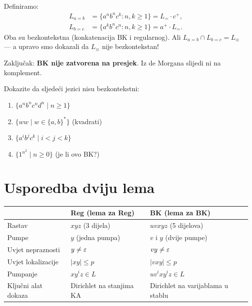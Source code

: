 \begin{primjer}
Definiramo:
\begin{align*}
  L_{a=b} &= \{a^n b^n c^k : n, k \geq 1\} = L_= \cdot c^+, \\
  L_{b=c} &= \{a^k b^n c^n : n, k \geq 1\} = a^+ \cdot L_=.
\end{align*}
Oba su bezkontekstna (konkatenacija BK i regularnog).
Ali $L_{a=b} \cap L_{b=c} = L_\equiv$ --- a upravo smo dokazali da
$L_\equiv$ nije bezkontekstan!

Zaključak: \textbf{BK nije zatvorena na presjek}. Iz de Morgana slijedi
ni na komplement.
\end{primjer}

\begin{zadatak}
Dokazite da sljedeći jezici nisu bezkontekstni:
\begin{enumerate}[label=(\alph*)]
  \item $\{a^n b^n c^n d^n \mid n \geq 1\}$
  \item $\{ww \mid w \in \{a,b\}^*\}$ (kvadrati)
  \item $\{a^i b^j c^k \mid i < j < k\}$
  \item $\{1^{n^2} \mid n \geq 0\}$ (je li ovo BK?)
\end{enumerate}
\end{zadatak}

\section{Usporedba dviju lema}

\begin{center}
\renewcommand{\arraystretch}{1.6}
\begin{tabular}{lll}
\hline
& \textbf{Reg (lema za Reg)} & \textbf{BK (lema za BK)} \\
\hline
Rastav & $xyz$ (3 dijela) & $uvxyz$ (5 dijelova) \\
Pumpe & $y$ (jedna pumpa) & $v$ i $y$ (dvije pumpe) \\
Uvjet nepraznosti & $y \neq \varepsilon$ & $vy \neq \varepsilon$ \\
Uvjet lokalizacije & $|xy| \leq p$ & $|vxy| \leq p$ \\
Pumpanje & $xy^iz \in L$ & $uv^ixy^iz \in L$ \\
Ključni alat dokaza & Dirichlet na stanjima KA & Dirichlet na varijablama u stablu \\
\hline
\end{tabular}
\end{center}


